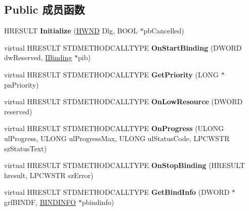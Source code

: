 \subsection*{Public 成员函数}
\begin{DoxyCompactItemize}
\item 
\mbox{\label{class_c_download_dialog_a25afa4c617307288d7d48ba71584dd39}} 
H\+R\+E\+S\+U\+LT {\bfseries Initialize} (\hyperlink{interfacevoid}{H\+W\+ND} Dlg, B\+O\+OL $\ast$pb\+Cancelled)
\item 
\mbox{\label{class_c_download_dialog_a6327dadc52df5f458d05104a2a18db96}} 
virtual H\+R\+E\+S\+U\+LT S\+T\+D\+M\+E\+T\+H\+O\+D\+C\+A\+L\+L\+T\+Y\+PE {\bfseries On\+Start\+Binding} (D\+W\+O\+RD dw\+Reserved, \hyperlink{interface_i_binding}{I\+Binding} $\ast$pib)
\item 
\mbox{\label{class_c_download_dialog_a58841e17ad0c84b10fca3c2f930b726b}} 
virtual H\+R\+E\+S\+U\+LT S\+T\+D\+M\+E\+T\+H\+O\+D\+C\+A\+L\+L\+T\+Y\+PE {\bfseries Get\+Priority} (L\+O\+NG $\ast$pn\+Priority)
\item 
\mbox{\label{class_c_download_dialog_ae9b18fb977987319000f63599f263541}} 
virtual H\+R\+E\+S\+U\+LT S\+T\+D\+M\+E\+T\+H\+O\+D\+C\+A\+L\+L\+T\+Y\+PE {\bfseries On\+Low\+Resource} (D\+W\+O\+RD reserved)
\item 
\mbox{\label{class_c_download_dialog_a36e730b6362fe99e4e1a47828d2c0f8d}} 
virtual H\+R\+E\+S\+U\+LT S\+T\+D\+M\+E\+T\+H\+O\+D\+C\+A\+L\+L\+T\+Y\+PE {\bfseries On\+Progress} (U\+L\+O\+NG ul\+Progress, U\+L\+O\+NG ul\+Progress\+Max, U\+L\+O\+NG ul\+Status\+Code, L\+P\+C\+W\+S\+TR sz\+Status\+Text)
\item 
\mbox{\label{class_c_download_dialog_ab0f1c82bf6f3900c3c4124b0566b690c}} 
virtual H\+R\+E\+S\+U\+LT S\+T\+D\+M\+E\+T\+H\+O\+D\+C\+A\+L\+L\+T\+Y\+PE {\bfseries On\+Stop\+Binding} (H\+R\+E\+S\+U\+LT hresult, L\+P\+C\+W\+S\+TR sz\+Error)
\item 
\mbox{\label{class_c_download_dialog_a8e8012dc841bbf2027fe288cff7d29fd}} 
virtual H\+R\+E\+S\+U\+LT S\+T\+D\+M\+E\+T\+H\+O\+D\+C\+A\+L\+L\+T\+Y\+PE {\bfseries Get\+Bind\+Info} (D\+W\+O\+RD $\ast$grf\+B\+I\+N\+DF, \hyperlink{struct_i_bind_status_callback_1_1__tag_b_i_n_d_i_n_f_o}{B\+I\+N\+D\+I\+N\+FO} $\ast$pbindinfo)

\end{DoxyCompactItemize}
